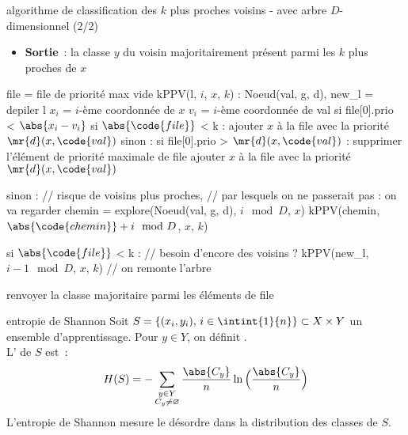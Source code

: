 \begin{adjustwidth}{-3cm}{-3cm}
\begin{implementation}{algorithme de classification des $k$ plus proches voisins - avec arbre $D$-dimensionnel (2/2)}
\begin{itemize}
\begin{itemize}
        \end{itemize}
        \item \textbf{Sortie}~: la classe $y$ du voisin majoritairement présent parmi les $k$ plus proches de $x$
    \end{itemize}
    \begin{lstLNat}
    file = file de priorité max vide
    kPPV(l, $i$, $x$, $k$) :
        Noeud(val, g, d), new_l = depiler l
        $x_{i}$ = $i$-ème coordonnée de $x$
        $v_{i}$ = $i$-ème coordonnée de val
        si file[0].prio < $\abs{x_{i} - v_{i}}$ 
            si $\abs{\code{file}}$ < k :
                ajouter $x$ à la file avec la priorité $\mr{d}(x,\code{val})$
            sinon :
                si file[0].prio > $\mr{d}(x,\code{val})$ :
                    supprimer l'élément de priorité maximale de file
                    ajouter $x$ à la file avec la priorité $\mr{d}(x,\code{val})$

        sinon : // risque de voisins plus proches, 
                // par lesquels on ne passerait pas : on va regarder
            chemin = explore(Noeud(val, g, d), $i \mod D$, $x$)
            kPPV(chemin, $\abs{\code{chemin}} + i \mod D$, $x$, $k$)
         
        si $\abs{\code{file}}$ < k : // besoin d'encore des voisins ?
            kPPV(new_l, $i-1 \mod D$, $x$, $k$) // on remonte l'arbre

        renvoyer la classe majoritaire parmi les éléments de file
    \end{lstLNat}
\end{implementation}

\begin{definition}{5.6}{entropie de Shannon}
    Soit $S = \{(x_i,y_i),\, i \in \intint{1}{n}\} \subset X \times Y$ un ensemble d'apprentissage. Pour $y \in Y$, on définit .\\
    L' de $S$ est~:
    $$H(S) = - \sum_{\substack{y \in Y\\C_y \neq \varnothing}}\frac{\abs{C_y}}{n} \ln\Big(\frac{\abs{C_y}}{n}\Big)$$
    L'entropie de Shannon mesure le désordre dans la distribution des classes de $S$.
\end{definition}


\end{adjustwidth}
